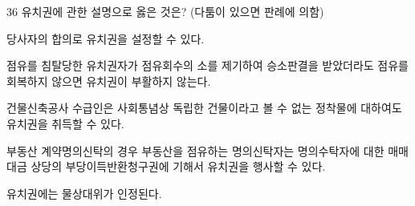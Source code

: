 \begin{question}{36}
유치권에 관한 설명으로 옳은 것은? (다툼이 있으면 판례에 의함)
\begin{choices}
  \item 당사자의 합의로 유치권을 설정할 수 있다.
  \item 점유를 침탈당한 유치권자가 점유회수의 소를 제기하여 승소판결을 받았더라도 점유를 회복하지 않으면 유치권이 부활하지 않는다.
  \item 건물신축공사 수급인은 사회통념상 독립한 건물이라고 볼 수 없는 정착물에 대하여도 유치권을 취득할 수 있다.
  \item 부동산 계약명의신탁의 경우 부동산을 점유하는 명의신탁자는 명의수탁자에 대한 매매대금 상당의 부당이득반환청구권에 기해서 유치권을 행사할 수 있다.
  \item 유치권에는 물상대위가 인정된다.
\end{choices}
\end{question}
